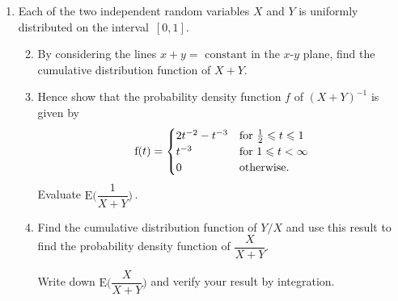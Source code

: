 \documentclass[a4, 11pt]{report}
\newlength{\qspace}
\newcounter{qnumber}
\newenvironment{question}%
 {\vspace{\qspace}
  \begin{enumerate}[\bfseries 1\quad][10]%
    \setcounter{enumi}{\value{qnumber}}%
    \item%
 }
{
  \end{enumerate}
  \filbreak
  \stepcounter{qnumber}
 }
\newenvironment{questionparts}[1][1]%
 {
  \begin{enumerate}[\bfseries (i)]%
    \setcounter{enumii}{#1}
    \addtocounter{enumii}{-1}
    \setlength{\itemsep}{5mm}
    \setlength{\parskip}{8pt}
 }
 {
  \end{enumerate}
 }
\def\f{{\mathrm f}}
\def\E{{\mathrm E}}
\def\le{\leqslant}
\renewcommand{\.}[1]{\ensuremath{\mathrm{#1}}}
\newcommand{\+}[1]{\ensuremath{\mathbf{#1}}}
\begin{document}
\begin{question}
Each of the two independent random variables $X$ and $Y$  is uniformly distributed on the interval~$[0,1]$.

\begin{questionparts}
\item By considering the lines $x+y =$ $\mathrm{constant}$ in the $x$-$y$ plane, find the cumulative distribution function of $X+Y$.
\item  
Hence show that the probability density function $f$ of $(X+Y)^{-1}$
is given by 
\[
\f(t) = 
\begin{cases}
2t^{-2} -t^{-3} & \text{for $ \tfrac12 \le t \le 1$} \\
t^{-3}  & \text{for $1\le t <\infty$}\\
0 & \text{otherwise}.
\end{cases}
\]
Evaluate $\E\Big(\dfrac1{X+Y}\Big)\,$.



\item Find the cumulative distribution function of $Y/X$ and use this result to find the probability density function of $\dfrac X {X+Y}$.

Write down $\E\Big( \dfrac X {X+Y}\Big)$ and verify your result by integration.



\end{questionparts}
\end{question}
\end{document}
